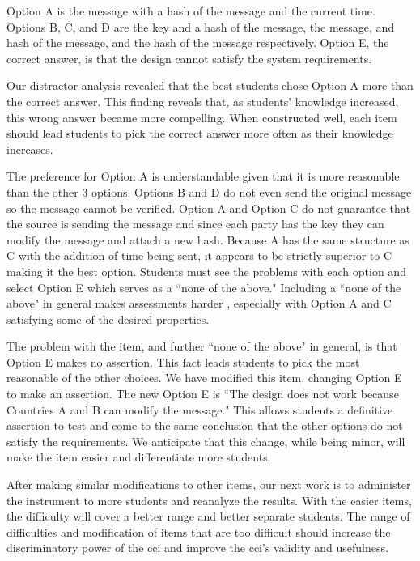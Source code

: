Option A is the message with a hash of the message and the current time. Options B, C, and D are the key and a hash of the message, the message, and hash of the message, and the hash of the message respectively. Option E, the correct answer, is that the design cannot satisfy the system requirements. 

Our distractor analysis revealed that the best students chose Option A more than the correct answer. This finding reveals that, as students' knowledge increased, this wrong answer became more compelling. When constructed well, each item should lead students to pick the correct answer more often as their knowledge increases.

The preference for Option A is understandable given that it is more reasonable than the other 3 options. Options B and D do not even send the original message so the message cannot be verified. Option A and Option C do not guarantee that the source is sending the message and since each party has the key they can modify the message and attach a new hash. Because A has the same structure as C with the addition of time being sent, it appears to be strictly superior to C making it the best option. Students must see the problems with each option and select Option E which serves as a ``none of the above." Including a ``none of the above" in general makes assessments harder \cite{none_of_above}, especially with Option A and C satisfying some of the desired properties. 

The problem with the item, and further ``none of the above" in general, is that Option E makes no assertion. This fact leads students to pick the most reasonable of the other choices. We have modified this item, changing Option E to make an assertion. The new Option E is ``The design does not work because Countries A and B can modify the message." This allows students a definitive assertion to test and come to the same conclusion that the other options do not satisfy the requirements. We anticipate that this change, while being minor, will make the item easier and differentiate more students.

After making similar modifications to other items, our next work is to administer the instrument to more students and reanalyze the results. With the easier items, the difficulty will cover a better range and better separate students. The range of difficulties and modification of items that are too difficult should increase the discriminatory power of the \gls{cci} and improve the \gls{cci}'s validity and usefulness.
